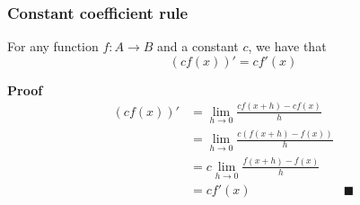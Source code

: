\subsubsection{Constant coefficient rule}
For any function \(f : A \to B\) and a constant \(c\), we have that
\begin{equation}
    \left(c f(x)\right)' = c f'(x)
\end{equation}

\textbf{Proof}
\begin{align*}
    \left(c f(x)\right)' &= \lim_{h \to 0}\frac{c f(x + h) - c f(x)}{h} \\
    &= \lim_{h \to 0} \frac{c\left(f(x + h) - f(x)\right)}{h} \\
    &= c \lim_{h \to 0} \frac{f(x + h) - f(x)}{h} \\
    &= c f'(x) & \blacksquare
\end{align*}